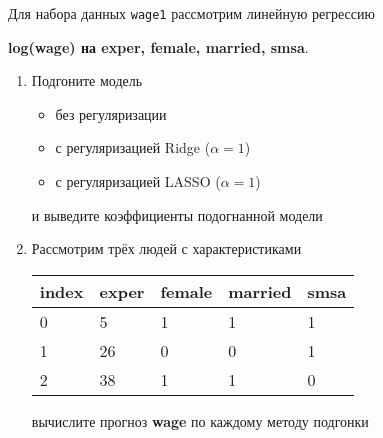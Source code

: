\begin{exercise}
Для набора данных \texttt{wage1} рассмотрим линейную регрессию 
\begin{center}
	\textbf{log(wage) на exper, female, married, smsa}.
\end{center}
\begin{enumerate}
	\item Подгоните модель
	\begin{itemize}
		\item без регуляризации
		\item с регуляризацией Ridge (\(\alpha=1\))
		\item с регуляризацией LASSO (\(\alpha=1\))
	\end{itemize}
	и выведите коэффициенты подогнанной модели
	\item Рассмотрим трёх людей с характеристиками
	\begin{center}
		\begin{tabular}{|l||l|l|l|l|}\hline
			index & exper & female & married & smsa \\ \hline\hline
			0 & 5 & 1 & 1 & 1  \\
			1 & 26 & 0 & 0 & 1 \\
			2 & 38 & 1 & 1 & 0 \\ \hline
		\end{tabular}
	\end{center}
	вычислите прогноз \textbf{wage} по каждому методу подгонки
\end{enumerate}
\end{exercise}

